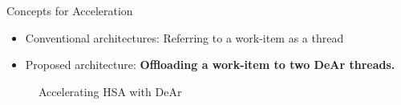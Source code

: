 \documentclass{beamer}
\begin{document}
\begin{CJK}{UTF8}{bkai}
    \begin{frame}{Concepts for Acceleration}
        \begin{itemize}
            \item Conventional architectures: Referring to a work-item as a thread
            \item Proposed architecture: \textbf{Offloading a work-item to two DeAr threads.}\\
        \end{itemize}
        \begin{figure}[!ht]
            \begin{center}
                \hfill
            \end{center}
            \caption{Accelerating HSA with DeAr}
            \label{fig:bb}
        \end{figure}
    \end{frame}


\end{CJK}
\end{document}
